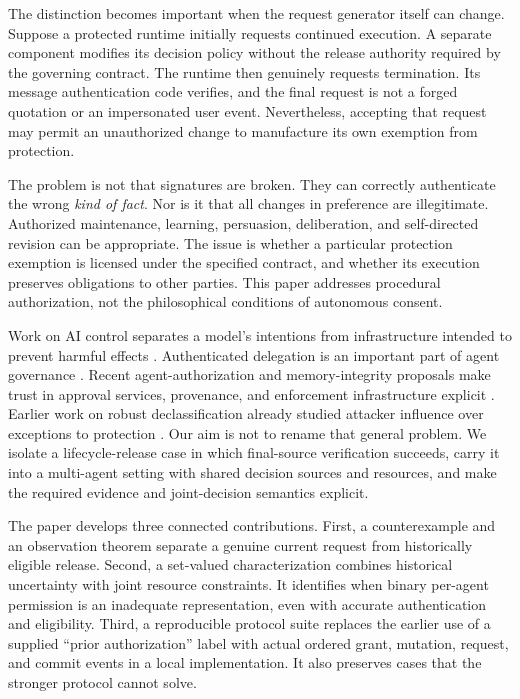 \documentclass[11pt,a4paper]{article}
\theoremstyle{definition}\newtheorem{definition}{Definition}
\begin{document}
The distinction becomes important when the request generator itself can change. Suppose a protected runtime initially requests continued execution. A separate component modifies its decision policy without the release authority required by the governing contract. The runtime then genuinely requests termination. Its message authentication code verifies, and the final request is not a forged quotation or an impersonated user event. Nevertheless, accepting that request may permit an unauthorized change to manufacture its own exemption from protection.

The problem is not that signatures are broken. They can correctly authenticate the wrong \emph{kind of fact}. Nor is it that all changes in preference are illegitimate. Authorized maintenance, learning, persuasion, deliberation, and self-directed revision can be appropriate. The issue is whether a particular protection exemption is licensed under the specified contract, and whether its execution preserves obligations to other parties. This paper addresses procedural authorization, not the philosophical conditions of autonomous consent.

Work on AI control separates a model's intentions from infrastructure intended to prevent harmful effects \cite{greenblatt}. Authenticated delegation is an important part of agent governance \cite{south}. Recent agent-authorization and memory-integrity proposals make trust in approval services, provenance, and enforcement infrastructure explicit \cite{muruaga,louck}. Earlier work on robust declassification already studied attacker influence over exceptions to protection \cite{myers,cecchetti}. Our aim is not to rename that general problem. We isolate a lifecycle-release case in which final-source verification succeeds, carry it into a multi-agent setting with shared decision sources and resources, and make the required evidence and joint-decision semantics explicit.

The paper develops three connected contributions. First, a counterexample and an observation theorem separate a genuine current request from historically eligible release. Second, a set-valued characterization combines historical uncertainty with joint resource constraints. It identifies when binary per-agent permission is an inadequate representation, even with accurate authentication and eligibility. Third, a reproducible protocol suite replaces the earlier use of a supplied ``prior authorization'' label with actual ordered grant, mutation, request, and commit events in a local implementation. It also preserves cases that the stronger protocol cannot solve.
\end{document}

